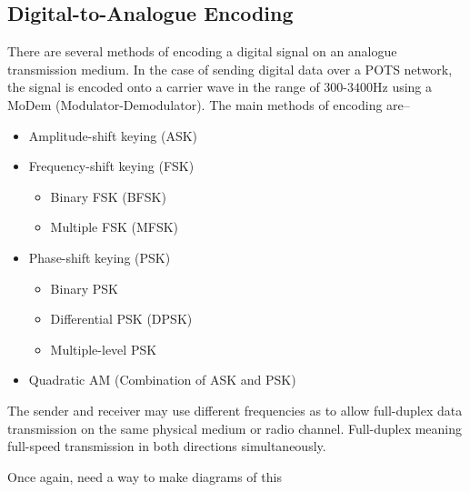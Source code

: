 \subsection*{Digital-to-Analogue Encoding}

There are several methods of encoding a digital signal on an analogue transmission medium. In the case of sending
 digital data over a POTS network, the signal is encoded onto a carrier wave in the range of $300$-$3400$Hz using a
 MoDem (Modulator-Demodulator). The main methods of encoding are--

\begin{itemize}
  \item Amplitude-shift keying (ASK)
  \item Frequency-shift keying (FSK)
  \begin{itemize}
    \item Binary FSK (BFSK)
    \item Multiple FSK (MFSK)
  \end{itemize}
  \item Phase-shift keying (PSK)
  \begin{itemize}
    \item Binary PSK
    \item Differential PSK (DPSK)
    \item Multiple-level PSK
  \end{itemize}
  \item Quadratic AM (Combination of ASK and PSK)
\end{itemize}

The sender and receiver may use different frequencies as to allow full-duplex data transmission on the same physical
 medium or radio channel. Full-duplex meaning full-speed transmission in both directions simultaneously.

{\Huge Once again, need a way to make diagrams of this}
